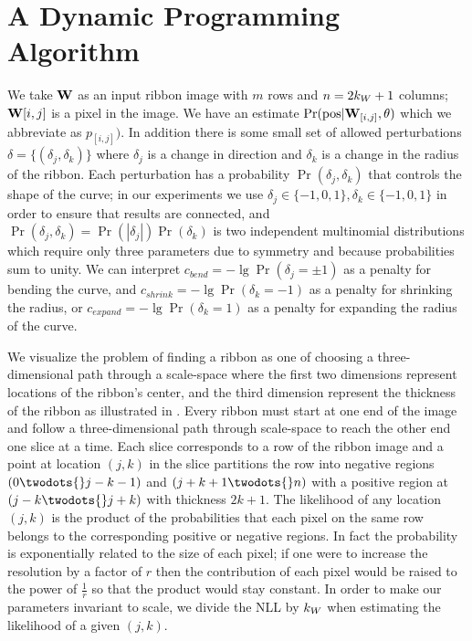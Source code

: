 \section{A Dynamic Programming Algorithm}

We take $\mathbf{W}{}$ as an input ribbon image with $m$ rows and $n=2k_W+1$ columns; $\mathbf{W}{}{[i,j]}$ is a pixel in the image. We have an estimate $\Pr(\text{pos}|\mathbf{W}{}_{[i,j]}, \theta)$ which we abbreviate as $p_{[i,j]})$. In addition there is some small set of allowed perturbations $\delta=\{(\delta_j, \delta_k)\}$ where $\delta_j$ is a change in direction and $\delta_k$ is a change in the radius of the ribbon. Each perturbation has a probability $\Pr(\delta_j, \delta_k)$ that controls the shape of the curve; in our experiments we use $\delta_j\in\{-1,0,1\}, \delta_k\in\{-1, 0,1\}$ in order to ensure that results are connected, and  $\Pr(\delta_j, \delta_k)=\Pr(|\delta_j|)\Pr(\delta_k)$ is two independent multinomial distributions which require only three parameters due to symmetry and because probabilities sum to unity. We can interpret $c_\mathit{bend}=-\lg \Pr(\delta_j=\pm1)$ as a penalty for bending the curve, and $c_\mathit{shrink}=-\lg \Pr(\delta_k=-1)$ as a penalty for shrinking the radius, or $c_\mathit{expand} = -\lg \Pr(\delta_k=1)$ as a penalty for expanding the radius of the curve. 

We visualize the problem of finding a ribbon as one of choosing a three-dimensional path through a scale-space where the first two dimensions represent locations of the ribbon's center, and the third dimension represent the thickness of the ribbon as illustrated in . Every ribbon must start at one end of the image and follow a three-dimensional path through scale-space to reach the other end one slice at a time. Each slice corresponds to a row of the ribbon image and a point at location $(j, k)$ in the slice partitions the row into negative regions $(0\twodots{}j-k-1)$ and $(j+k+1\twodots{}n)$ with a positive region at $(j-k \twodots{} j+k)$ with thickness $2k+1$. The likelihood of any location $(j, k)$ is the product of the probabilities that each pixel on the same row belongs to the corresponding positive or negative regions.  In fact the probability is exponentially related to the size of each pixel; if one were to increase the resolution by a factor of $r$ then the contribution of each pixel would be raised to the power of $\frac{1}{r}$ so that the product would stay constant. In order to make our parameters invariant to scale, we divide the \ac{NLL} by $k_W{}$ when estimating the likelihood of a given $(j,k)$. 

